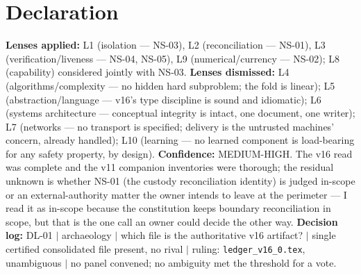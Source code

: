 \documentclass[11pt]{article}
\begin{document}
\section{Declaration}
\textbf{Lenses applied:} L1 (isolation --- NS-03), L2 (reconciliation --- NS-01), L3
(verification/liveness --- NS-04, NS-05), L9 (numerical/currency --- NS-02); L8 (capability)
considered jointly with NS-03. \textbf{Lenses dismissed:} L4 (algorithms/complexity --- no
hidden hard subproblem; the fold is linear); L5 (abstraction/language --- v16's type discipline
is sound and idiomatic); L6 (systems architecture --- conceptual integrity is intact, one
document, one writer); L7 (networks --- no transport is specified; delivery is the untrusted
machines' concern, already handled); L10 (learning --- no learned component is load-bearing for
any safety property, by design). \textbf{Confidence:} MEDIUM-HIGH. The v16 read was complete and
the v11 companion inventories were thorough; the residual unknown is whether NS-01 (the
custody reconciliation identity) is judged in-scope or an external-authority matter the owner
intends to leave at the perimeter --- I read it as in-scope because the constitution keeps
boundary reconciliation in scope, but that is the one call an owner could decide the other way.
\textbf{Decision log:} DL-01 $\mid$ archaeology $\mid$ which file is the authoritative v16
artifact? $\mid$ single certified consolidated file present, no rival $\mid$ ruling:
\texttt{ledger\_v16\_0.tex}, unambiguous $\mid$ no panel convened; no ambiguity met the
threshold for a vote.
\end{document}
